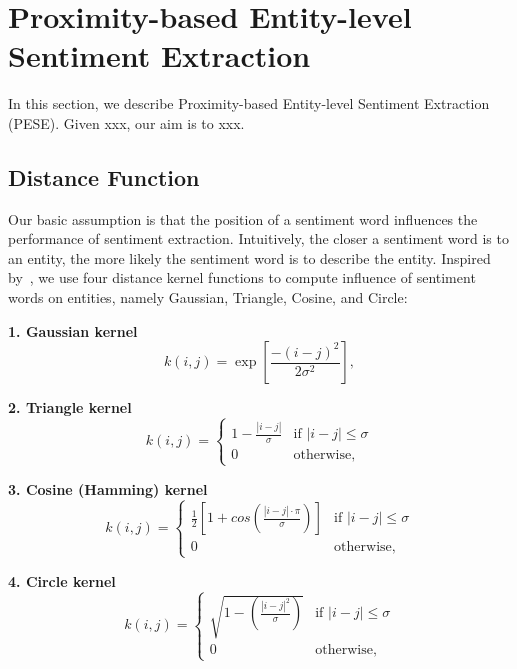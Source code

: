 \documentclass[runningheads]{llncs}
\begin{document}
\section{Proximity-based Entity-level Sentiment Extraction}\label{sec:sentiment classification}
In this section, we describe Proximity-based Entity-level Sentiment Extraction (PESE). Given xxx, our aim is to xxx.

\subsection{Distance Function}
Our basic assumption is that the position of a sentiment word influences the performance of sentiment extraction. Intuitively, the closer a sentiment word is to an entity, the more likely the sentiment word is to describe the entity. Inspired by~\cite{}, we use four distance kernel functions to compute influence of sentiment words on entities, namely Gaussian, Triangle, Cosine, and Circle:

\textbf{1. Gaussian kernel}
\begin{equation}
    k(i,j) = \exp\left[\frac{-(i-j)^2}{2\sigma^2}\right],
\end{equation}

\textbf{2. Triangle kernel}
\begin{equation}
k(i,j)=\begin{cases}
1-\frac{|i-j|}{\sigma} &\mbox{if $|i-j|\leq \sigma$}\\
0 &\mbox{otherwise},
\end{cases}
\end{equation}

\textbf{3. Cosine (Hamming) kernel}
\begin{equation}
k(i,j)=\begin{cases}
\frac{1}{2}\left[1+cos\left(\frac{|i-j|\cdot\pi}{\sigma}\right)\right] &\mbox{if $|i-j|\leq \sigma$}\\
0 &\mbox{otherwise},
\end{cases}
\end{equation}

\textbf{4. Circle kernel}
\begin{equation}
k(i,j)=\begin{cases}
\sqrt{1-\left(\frac{|i-j|^2}{\sigma}\right)} &\mbox{if $|i-j|\leq \sigma$}\\
0 &\mbox{otherwise},
\end{cases}
\end{equation}
\end{document}
